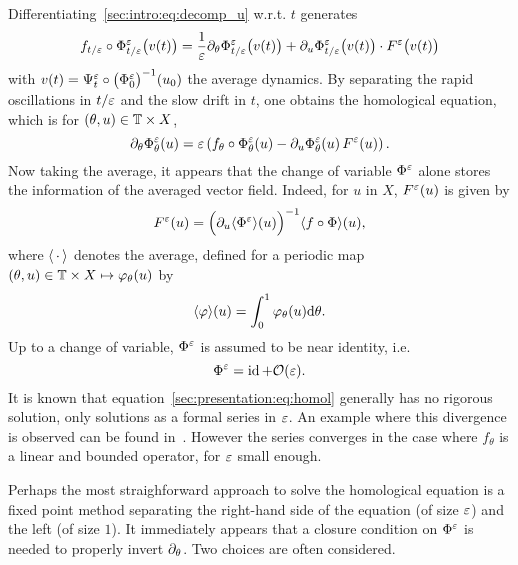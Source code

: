 Differentiating~\eqref{sec:intro:eq:decomp_u} w.r.t. \( t \) generates
\begin{equation*}
  f_{t/\varepsilon} \circ \Phi^{\varepsilon}_{t/\varepsilon} \big( v(t) \big) 
  = \frac{1}{\varepsilon} \partial_\theta \Phi^{\varepsilon}_{t/\varepsilon} \big( v(t) \big)
  + \partial_u \Phi^{\varepsilon}_{t/\varepsilon}\big( v(t) \big) \cdot F^{\varepsilon} \big( v(t) \big)
\end{equation*}
with \( v(t) = \Psi^{\varepsilon}_t \circ \big( \Phi^{\varepsilon}_0 \big)^{-1} (u_0) \) the
average dynamics. By separating the rapid oscillations in $t/\varepsilon$ and the
slow drift in $t$, one obtains the homological equation, which is for
$(\theta, u) \in \mathbb{T} \times X$, 
\begin{equation} \label{sec:presentation:eq:homol}
  \partial_\theta \Phi^{\varepsilon}_{\theta} (u)
  = \varepsilon \left( f_{\theta} \circ \Phi^{\varepsilon}_{\theta} (u) 
    - \partial_u \Phi^{\varepsilon}_{\theta} (u) \, F^{\varepsilon} (u) \right) .
\end{equation}
Now taking the average, it appears that the change of variable $\Phi^{\varepsilon}$
alone stores the information of the averaged vector field. Indeed, for $u$
in $X$, $F^{\varepsilon}(u)$ is given by
\begin{equation}
  F^{\varepsilon} (u) = \Big( \partial_u \langle \Phi^{\varepsilon} \rangle (u) \Big)^{-1} 
        \langle f \circ \Phi \rangle (u) ,
\end{equation}
where $\langle \,\cdot\, \rangle$ denotes the average, defined for a periodic map
$ (\theta, u) \in \mathbb{T} \times X \mapsto \varphi_\theta(u)$ by
\begin{equation}
  \langle \varphi \rangle (u) = \int_0^1 \varphi_\theta (u) \mathrm{d} \theta .
\end{equation}
Up to a change of variable, $\Phi^{\varepsilon}$ is assumed to be near identity,
i.e. 
\begin{equation}
  \Phi^{\varepsilon} = \operatorname{id} + \mathcal{O}(\varepsilon) .
\end{equation}
It is known that equation~\eqref{sec:presentation:eq:homol} generally has no
rigorous solution, only solutions as a formal series in $\varepsilon$. An example
where this divergence is observed can be found
in~\cite{chartier.2010.higher}. However the series converges in the
case where $f_\theta$ is a linear and bounded operator, for $\varepsilon$ small
enough. 


Perhaps the most straighforward approach to solve the homological equation
is a fixed point method separating the right-hand side of the equation (of
size $\varepsilon$) and the left (of size $1$). It immediately appears that a
closure condition on $\Phi^{\varepsilon}$ is needed to properly invert
$\partial_\theta$. Two choices are often considered.

